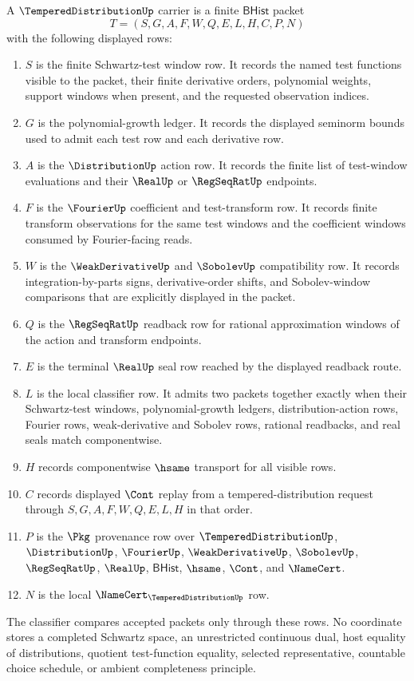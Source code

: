 \begin{definition}
\label{def:tempered-distribution-carrier}
A $\TemperedDistributionUp$ carrier is a finite $\mathsf{BHist}$ packet
$$
T=(S,G,A,F,W,Q,E,L,H,C,P,N)
$$
with the following displayed rows:
\begin{enumerate}
\item $S$ is the finite Schwartz-test window row. It records the named test functions visible to the packet, their finite derivative orders, polynomial weights, support windows when present, and the requested observation indices.
\item $G$ is the polynomial-growth ledger. It records the displayed seminorm bounds used to admit each test row and each derivative row.
\item $A$ is the $\DistributionUp$ action row. It records the finite list of test-window evaluations and their $\RealUp$ or $\RegSeqRatUp$ endpoints.
\item $F$ is the $\FourierUp$ coefficient and test-transform row. It records finite transform observations for the same test windows and the coefficient windows consumed by Fourier-facing reads.
\item $W$ is the $\WeakDerivativeUp$ and $\SobolevUp$ compatibility row. It records integration-by-parts signs, derivative-order shifts, and Sobolev-window comparisons that are explicitly displayed in the packet.
\item $Q$ is the $\RegSeqRatUp$ readback row for rational approximation windows of the action and transform endpoints.
\item $E$ is the terminal $\RealUp$ seal row reached by the displayed readback route.
\item $L$ is the local classifier row. It admits two packets together exactly when their Schwartz-test windows, polynomial-growth ledgers, distribution-action rows, Fourier rows, weak-derivative and Sobolev rows, rational readbacks, and real seals match componentwise.
\item $H$ records componentwise $\hsame$ transport for all visible rows.
\item $C$ records displayed $\Cont$ replay from a tempered-distribution request through $S,G,A,F,W,Q,E,L,H$ in that order.
\item $P$ is the $\Pkg$ provenance row over $\TemperedDistributionUp$, $\DistributionUp$, $\FourierUp$, $\WeakDerivativeUp$, $\SobolevUp$, $\RegSeqRatUp$, $\RealUp$, $\mathsf{BHist}$, $\hsame$, $\Cont$, and $\NameCert$.
\item $N$ is the local $\NameCert_{\TemperedDistributionUp}$ row.
\end{enumerate}
The classifier compares accepted packets only through these rows. No coordinate stores a completed Schwartz space, an unrestricted continuous dual, host equality of distributions, quotient test-function equality, selected representative, countable choice schedule, or ambient completeness principle.
\end{definition}

